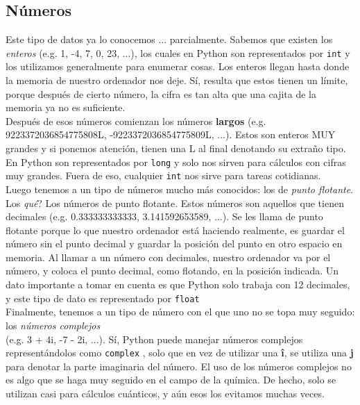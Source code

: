 \documentclass[10pt,letterpaper]{article}
\newcommand{\inlinecode}[1]{
\colorbox{light-gray}{\texttt{#1}}
}
\begin{document}
\subsection{N\'umeros}
Este tipo de datos ya lo conocemos ... parcialmente. Sabemos que existen los \textit{enteros} (e.g. 1, -4, 7, 0, 23, ...), los cuales en Python son representados por \inlinecode{int} y los utilizamos generalmente para enumerar cosas. Los enteros llegan hasta donde la memoria de nuestro ordenador nos deje. S\'i, resulta que estos tienen un l\'imite, porque despu\'es de cierto n\'umero, la cifra es tan alta que una cajita de la memoria ya no es suficiente.\\

Despu\'es de esos n\'umeros comienzan los n\'umeros \textbf{largos} (e.g. 9223372036854775808L, -9223372036854775809L, ...). Estos son enteros MUY grandes y si ponemos atenci\'on, tienen una L al final denotando su extra\~no tipo. En Python son representados por \inlinecode{long} y solo nos sirven para c\'alculos con cifras muy grandes. Fuera de eso, cualquier \inlinecode{int} nos sirve para tareas cotidianas.\\

Luego tenemos a un tipo de n\'umeros mucho m\'as conocidos: los de \textit{punto flotante}. Los \emph{qu\'e}? Los n\'umeros de punto flotante. Estos n\'umeros son aquellos que tienen decimales (e.g. 0.333333333333, 3.141592653589, ...). Se les llama de punto flotante porque lo que nuestro  ordenador est\'a haciendo realmente, es guardar el n\'umero sin el punto decimal y guardar la posici\'on del punto en otro espacio en memoria. Al llamar a un n\'umero con decimales, nuestro ordenador va por el n\'umero, y coloca el punto decimal, como flotando, en la posici\'on indicada. Un dato importante a tomar en cuenta es que Python solo trabaja con 12 decimales, y este tipo de dato es representado por \inlinecode{float}\\

Finalmente, tenemos a un tipo de n\'umero con el que uno no se topa muy seguido: los \textit{n\'umeros complejos}\\(e.g. 3 + 4i, -7 - 2i, ...). S\'i, Python puede manejar n\'umeros complejos represent\'andolos como \inlinecode{complex}, solo que en vez de utilizar una \textbf{\^{i}}, se utiliza una \textbf{j} para denotar la parte imaginaria del n\'umero. El uso de los n\'umeros complejos no es algo que se haga muy seguido en el campo de la qu\'imica. De hecho, solo se utilizan casi para c\'alculos cu\'anticos, y a\'un esos los evitamos muchas veces.
\end{document}
